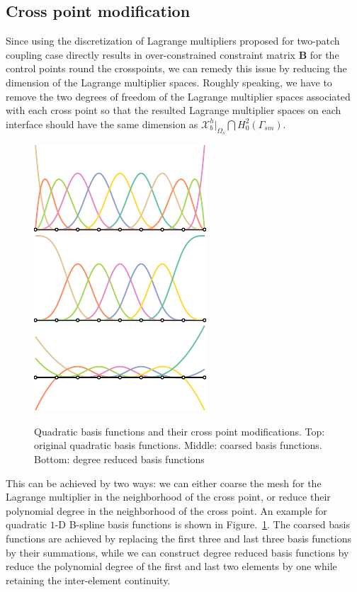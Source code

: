 \documentclass[preprint,12pt]{elsarticle}
\theoremstyle{remark}
\begin{document}
\subsection{Cross point modification}
Since using the discretization of Lagrange multipliers proposed for two-patch coupling case directly results in over-constrained constraint matrix $\mathbf{B}$ for the control points round the crosspoints, we can remedy this issue by reducing the dimension of the Lagrange multiplier spaces. Roughly speaking, we have to remove the two degrees of freedom of the Lagrange multiplier spaces associated with each cross point so that the resulted Lagrange multiplier spaces on each interface should have the same dimension as $\mathcal{X}_b^h\vert_{\Omega_s}\bigcap{}H_0^2(\Gamma_{sm})$.\par
\begin{figure}[hbt]
	\centering
    \includegraphics[width=.5\linewidth]{basis_original}\\
    \includegraphics[width=.5\linewidth]{basis_coarse}\\
    \includegraphics[width=.5\linewidth]{basis_reduce_degree}
	\caption{Quadratic basis functions and their cross point modifications. Top: original quadratic basis functions. Middle: coarsed basis functions. Bottom: degree reduced basis functions}\label{fig:boundary_modification}
\end{figure}
This can be achieved by two ways: we can either coarse the mesh for the Lagrange multiplier in the neighborhood of the cross point, or reduce their polynomial degree in the neighborhood of the cross point. An example for quadratic $1$-D B-spline basis functions is shown in Figure.~\ref{fig:boundary_modification}. The coarsed basis functions are achieved by replacing the first three and last three basis functions by their summations, while we can construct degree reduced basis functions by reduce the polynomial degree of the first and last two elements by one while retaining the inter-element continuity.\par
\end{document}
